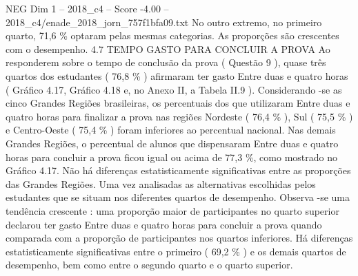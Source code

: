 \begin{textsample}{NEG Dim 1 – 2018\_c4 – Score -4.00 – 2018\_c4/enade\_2018\_jorn\_757f1bfa09.txt}
No outro extremo, no primeiro quarto, 71,6 \% optaram pelas mesmas categorias.
As proporções são crescentes com o desempenho. 4.7 TEMPO GASTO PARA CONCLUIR A PROVA Ao responderem sobre o tempo de conclusão da prova ( Questão 9 ), quase três quartos dos estudantes ( 76,8 \% ) afirmaram ter gasto Entre duas e quatro horas ( Gráfico 4.17, Gráfico 4.18 e, no Anexo II, a Tabela II.9 ).
Considerando -se as cinco Grandes Regiões brasileiras, os percentuais dos que utilizaram Entre duas e quatro horas para finalizar a prova nas regiões Nordeste ( 76,4 \% ), Sul ( 75,5 \% ) e Centro-Oeste ( 75,4 \% ) foram inferiores ao percentual nacional.
Nas demais Grandes Regiões, o percentual de alunos que dispensaram Entre duas e quatro horas para concluir a prova ficou igual ou acima de 77,3 \%, como mostrado no Gráfico 4.17.
Não há diferenças estatisticamente significativas entre as proporções das Grandes Regiões.
Uma vez analisadas as alternativas escolhidas pelos estudantes que se situam nos diferentes quartos de desempenho.
Observa -se uma tendência crescente : uma proporção maior de participantes no quarto superior declarou ter gasto Entre duas e quatro horas para concluir a prova quando comparada com a proporção de participantes nos quartos inferiores.
Há diferenças estatisticamente significativas entre o primeiro ( 69,2 \% ) e os demais quartos de desempenho, bem como entre o segundo quarto e o quarto superior.

\end{textsample}
